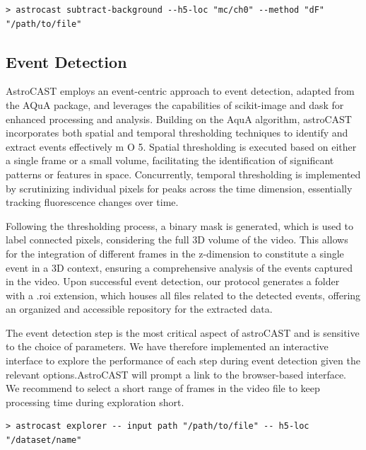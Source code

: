 \documentclass[utf8]{FrontiersinHarvard}
\newcommand{\fref}{ m O{} }{ (Figure~\ref{fig:#1}\IfValueT{#2}{\,#2})}
\begin{document}
    \begin{lstlisting}[style=bashStyle]
        > astrocast subtract-background --h5-loc "mc/ch0" --method "dF" "/path/to/file"
    \end{lstlisting}

    \subsection{Event Detection}

    AstroCAST employs an event-centric approach to event detection, adapted from the AQuA package\citep{wang_event-based_2018}, and leverages the capabilities of scikit-image and dask for enhanced processing and analysis\citep{van_der_walt_scikit-image_2014,dask_development_team_dask_2016}. Building on the AquA algorithm, astroCAST incorporates both spatial and temporal thresholding techniques to identify and extract events effectively \fref{5}. Spatial thresholding is executed based on either a single frame or a small volume, facilitating the identification of significant patterns or features in space. Concurrently, temporal thresholding is implemented by scrutinizing individual pixels for peaks across the time dimension, essentially tracking fluorescence changes over time.

    Following the thresholding process, a binary mask is generated, which is used to label connected pixels, considering the full 3D volume of the video. This allows for the integration of different frames in the z-dimension to constitute a single event in a 3D context, ensuring a comprehensive analysis of the events captured in the video. Upon successful event detection, our protocol generates a folder with a .roi extension, which houses all files related to the detected events, offering an organized and accessible repository for the extracted data.

    The event detection step is the most critical aspect of astroCAST and is sensitive to the choice of parameters. We have therefore implemented an interactive interface to explore the performance of each step during event detection given the relevant options.AstroCAST will prompt a link to the browser-based interface. We recommend to select a short range of frames in the video file to keep processing time during exploration short.

    \begin{lstlisting}[style=bashStyle]
        > astrocast explorer -- input path "/path/to/file" -- h5-loc "/dataset/name"
    \end{lstlisting}
\end{document}

